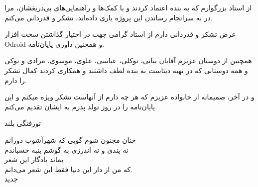 


\begin{center}
\end{center}

از استاد بزرگوارم  که به بنده اعتماد کردند و با کمک‌ها و راهنمایی‌های بی‌دریغشان، مرا در به سرانجام رساندن این پروژه یاری داده‌اند، تشکر و قدردانی می‌کنم.

عرض تشکر و قدردانی دارم از استاد گرامی  جهت در اختیار گذاشتن سخت افزار Odroid و همچنین داوری پایان‌نامه.

همچنین از دوستان عزیزم آقایان بیاتی، توکلی، عباسی، علوی، موسوی، مرادی و نوکی و همه دوستانی که در تهیه دیتاست به بنده لطف داشتند و همکاری کردند کمال تشکر را دارم.

و در آخر، صمیمانه از خانواده عزیزم که هر چه دارم از آنهاست تشکر ویژه میکنم و این پایان‌نامه را در روز تولد پدرم  به ایشان تقدیم می‌کنم.

‌تورفتگی
‌بلند

چنان مجنون شوم گویی که شهرآشوب دورانم\\
نه پندی و نه اندرزی به گوشم پنبه چسباندم\\
بماند یادگار این شعر\\
که من از دار این دنیا فقط این شعر می‌دانم.\\

‌جدید
